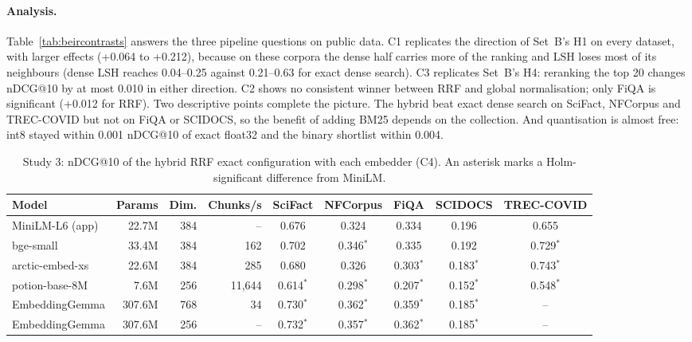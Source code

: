\documentclass[pdflatex,sn-basic,Numbered]{sn-jnl}
\makeatletter
\newcommand{\ndcg}{nDCG@10}
\makeatother
\begin{document}
\paragraph{Analysis.} Table~\ref{tab:beircontrasts} answers the three pipeline questions on public data. C1 replicates the direction of Set~B's H1 on every dataset, with larger effects (+0.064 to +0.212), because on these corpora the dense half carries more of the ranking and LSH loses most of its neighbours (dense LSH reaches 0.04--0.25 against 0.21--0.63 for exact dense search). C3 replicates Set~B's H4: reranking the top 20 changes \ndcg{} by at most 0.010 in either direction. C2 shows no consistent winner between RRF and global normalisation; only FiQA is significant (+0.012 for RRF). Two descriptive points complete the picture. The hybrid beat exact dense search on SciFact, NFCorpus and TREC-COVID but not on FiQA or SCIDOCS, so the benefit of adding BM25 depends on the collection. And quantisation is almost free: int8 stayed within 0.001 \ndcg{} of exact float32 and the binary shortlist within 0.004.

\begin{table}[tbp]
\centering\footnotesize\setlength{\tabcolsep}{3pt}
\caption{Study 3: \ndcg{} of the hybrid RRF exact configuration with each embedder (C4). An asterisk marks a Holm-significant difference from MiniLM.}
\label{tab:embedders}
\begin{tabular}{lrrrccccc}
\toprule
Model & Params & Dim. & Chunks/s\footnotemark[1] & SciFact & NFCorpus & FiQA & SCIDOCS & TREC-COVID \\
\midrule
MiniLM-L6 (app) & 22.7M & 384 & -- & 0.676 & 0.324 & 0.334 & 0.196 & 0.655 \\
bge-small & 33.4M & 384 & 162 & 0.702 & 0.346$^{*}$ & 0.335 & 0.192 & 0.729$^{*}$ \\
arctic-embed-xs & 22.6M & 384 & 285 & 0.680 & 0.326 & 0.303$^{*}$ & 0.183$^{*}$ & 0.743$^{*}$ \\
potion-base-8M & 7.6M & 256 & 11,644 & 0.614$^{*}$ & 0.298$^{*}$ & 0.207$^{*}$ & 0.152$^{*}$ & 0.548$^{*}$ \\
EmbeddingGemma & 307.6M & 768 & 34 & 0.730$^{*}$ & 0.362$^{*}$ & 0.359$^{*}$ & 0.185$^{*}$ & -- \\
EmbeddingGemma & 307.6M & 256 & --\footnotemark[2] & 0.732$^{*}$ & 0.357$^{*}$ & 0.362$^{*}$ & 0.185$^{*}$ & -- \\
\bottomrule
\end{tabular}
\end{table}
\end{document}
